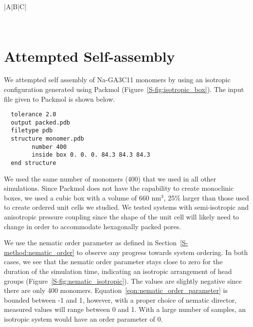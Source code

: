 \begin{table}[htb!]
\begin{tabular}{|A|B|C|}
  \end{tabular}
  
  \caption{The first column provides the names of the python scripts available in
  the \texttt{llcsim} GitHub repository that were used for system setup and post-simulation 
  trajectory analysis. Paths preceding script names are relative to the 
  \texttt{llcsim} root directory. The second columns lists the section in the main
  text where the output or usage of the script is first described. The third column
  gives a brief description of the purpose of each script.
  }~\label{S-table:python_scripts_structure}
  
  \end{table}
  
  \clearpage
  
  \section{Attempted Self-assembly}\label{S-section:self_assembly}
  
  We attempted self assembly of Na-GA3C11 monomers by using an isotropic configuration
  generated using Packmol \cite{martinez_packmol:_2009} (Figure~\ref{S-fig:isotropic_box}).
  The input file given to Packmol is shown below.
  
  \lstset{language=bash}
  \begin{lstlisting}
  tolerance 2.0
  output packed.pdb
  filetype pdb
  structure monomer.pdb
  		number 400
  		inside box 0. 0. 0. 84.3 84.3 84.3
  end structure
  \end{lstlisting}

  We used the same number of monomers (400) that we used in all other simulations. 
  Since Packmol does not have the capability to create monoclinic boxes, we used a cubic
  box with a volume of 660 nm$^3$, 25\% larger than those used to create ordered unit
  cells we studied. We tested systems with semi-isotropic and anisotropic pressure 
  coupling since the shape of the unit cell will likely need to change in order to 
  accommodate hexagonally packed pores.
  
  We use the nematic order parameter as defined in Section~\ref{S-method:nematic_order} to 
  observe any progress towards system ordering. In both cases, we see that the nematic
  order parameter stays close to zero for the duration of the simulation time, indicating
  an isotropic arrangement of head groups (Figure~\ref{S-fig:nematic_isotropic}). The values
  are slightly negative since there are only 400 monomers. 
  Equation~\ref{eqn:nematic_order_parameter} is bounded between -1 and 1, however, with a
  proper choice of nematic director, measured values will range between 0 and 1. With a 
  large number of samples, an isotropic system would have an order parameter of 0.
  
